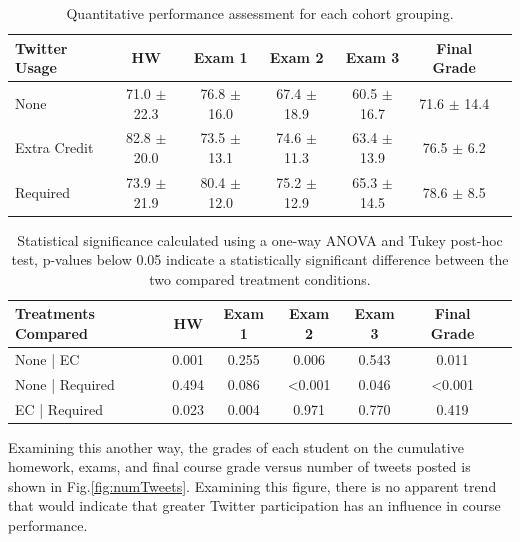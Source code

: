 \documentclass[12pt]{article}
\begin{document}
\begin{table}[H]
\caption{Quantitative performance assessment for each cohort grouping.}
\begin{center}
\label{quantPerformance}
\begin{tabular}{lcccccc}
\hline
 Twitter Usage & HW & Exam 1 & Exam 2 & Exam 3 & Final Grade\\
\hline
 None & 71.0 $\pm$ 22.3 & 76.8 $\pm$ 16.0 & 67.4 $\pm$ 18.9 & 60.5 $\pm$ 16.7 & 71.6 $\pm$ 14.4\\ 
 Extra Credit & 82.8 $\pm$ 20.0 & 73.5 $\pm$ 13.1 & 74.6 $\pm$ 11.3 & 63.4 $\pm$ 13.9 & 76.5 $\pm$ 6.2\\ 
 Required & 73.9 $\pm$ 21.9 & 80.4 $\pm$ 12.0 & 75.2 $\pm$ 12.9 & 65.3 $\pm$ 14.5 & 78.6 $\pm$ 8.5\\ 
\hline
\end{tabular}
\end{center}
\end{table}

\begin{table}[H]
\caption{Statistical significance calculated using a one-way ANOVA and Tukey post-hoc test, p-values below 0.05 indicate a statistically significant difference between the two compared treatment conditions.}
\begin{center}
\label{ANOVA}
\begin{tabular}{lcccccc}
\hline
 Treatments Compared & HW & Exam 1 & Exam 2 & Exam 3 & Final Grade\\
\hline
 None | EC & 0.001 & 0.255 & 0.006 & 0.543 & 0.011\\ 
 None | Required & 0.494 & 0.086 & \textless 0.001 & 0.046 & \textless 0.001\\ 
 EC | Required & 0.023 & 0.004 & 0.971 & 0.770 & 0.419\\ 
\hline
\end{tabular}
\end{center}
\end{table}

Examining this another way, the grades of each student on the cumulative homework, exams, and final course grade versus number of tweets posted is shown in Fig.\ref{fig:numTweets}. Examining this figure, there is no apparent trend that would indicate that greater Twitter participation has an influence in course performance.
\end{document}
